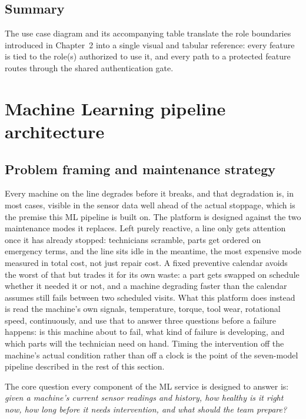 \subsection{Summary}

The use case diagram and its accompanying table translate the role boundaries introduced in Chapter~2 into a single visual and tabular reference: every feature is tied to the role(s) authorized to use it, and every path to a protected feature routes through the shared authentication gate.

\section{Machine Learning pipeline architecture}
\label{sec:ml-pipeline-architecture}

\subsection{Problem framing and maintenance strategy}

Every machine on the line degrades before it breaks, and that degradation is, in most cases, visible in the sensor data well ahead of the actual stoppage, which is the premise this ML pipeline is built on. The platform is designed against the two maintenance modes it replaces. Left purely reactive, a line only gets attention once it has already stopped: technicians scramble, parts get ordered on emergency terms, and the line sits idle in the meantime, the most expensive mode measured in total cost, not just repair cost. A fixed preventive calendar avoids the worst of that but trades it for its own waste: a part gets swapped on schedule whether it needed it or not, and a machine degrading faster than the calendar assumes still fails between two scheduled visits. What this platform does instead is read the machine's own signals, temperature, torque, tool wear, rotational speed, continuously, and use that to answer three questions before a failure happens: is this machine about to fail, what kind of failure is developing, and which parts will the technician need on hand. Timing the intervention off the machine's actual condition rather than off a clock is the point of the seven-model pipeline described in the rest of this section.

The core question every component of the ML service is designed to answer is: \emph{given a machine's current sensor readings and history, how healthy is it right now, how long before it needs intervention, and what should the team prepare?}

